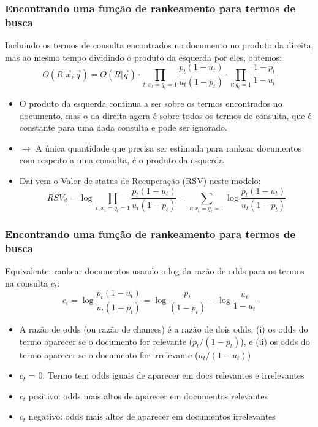 \documentclass[compress]{beamer}
\def\myblue#1{\textcolor{texblue}{#1}}
\begin{document}
\begin{frame}[<+->]
\frametitle{Encontrando uma função de rankeamento para termos de busca}
\pause[2]

Incluindo os termos de consulta encontrados no documento no produto da direita, mas   ao mesmo tempo dividindo o produto da esquerda por eles, obtemos:
\begin{equation}
\nonumber
O(R|\vec{x},\vec{q}) = O(R|\vec{q}) \cdot
\prod_{t: x_t = q_t =1}
\frac{p_t(1-u_t)}{u_t(1-p_t)} \cdot
\prod_{t: q_t=1}
\frac{1-p_t}{1-u_t}
\end{equation}

\begin{itemize}
\item O produto da esquerda continua a ser sobre os termos encontrados no 
documento, mas o da direita agora é sobre todos os termos de consulta, que é 
constante para uma dada consulta e pode ser ignorado. 

\item $\rightarrow$ \myblue{A única quantidade que precisa ser estimada para rankear documentos com respeito a uma consulta, é o produto da esquerda} 


\item Daí vem o  \myblue{Valor de status de Recuperação} (RSV) neste modelo:
\begin{equation}
\nonumber
RSV_d = \log \prod_{t: x_t = q_t =1} \frac{p_t(1-u_t)}{u_t(1-p_t)} =
\sum_{t: x_t = q_t =1} \log \frac{p_t(1-u_t)}{u_t(1-p_t)}
\end{equation}
\end{itemize}
\end{frame}
\begin{frame}[<+->]
\frametitle{Encontrando uma função de rankeamento para termos de busca}
\pause[2]

Equivalente: rankear documentos usando o \myblue{log da razão de odds} para os termos na consulta $c_t$:
\begin{equation}
\nonumber
c_t = \log \frac{p_t(1-u_t)}{u_t(1-p_t)} = \log \frac{p_t}{(1-p_t)} - \log \frac{u_t}{1-u_t}
\end{equation}
\begin{itemize}

\item A  \myblue{razão de odds } (ou razão de chances) é a razão de dois odds: (i) os odds do termo aparecer se o documento for relevante ($p_t/(1-p_t)$), e (ii)
os odds do termo aparecer se o documento for irrelevante ($u_t/(1-u_t)$) %

\item $c_t$ = 0: Termo tem odds iguais de aparecer em docs relevantes e irrelevantes
\item $c_t$ positivo: odds mais altos de aparecer em documentos relevantes
\item $c_t$ negativo: odds mais altos de aparecer em documentos irrelevantes
\end{itemize}
\end{frame}
\end{document}
